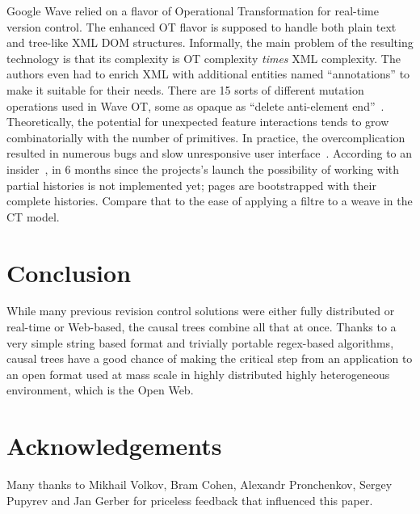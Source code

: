 \documentclass{acm_proc_article-sp}
\begin{document}
Google Wave relied on a flavor of Operational Transformation for
real-time version control. The enhanced OT flavor is supposed to
handle both plain text and tree-like XML DOM structures.
Informally, the main problem of the resulting technology is that
its complexity is OT complexity \emph{times} XML complexity. 
The authors even had to enrich XML with additional entities 
named ``annotations'' to make it suitable for their needs.
There are 15 sorts of different mutation operations used in Wave
OT, some as opaque as ``delete anti-element end''~\cite{waveot}.
Theoretically, the potential for unexpected feature interactions
tends to grow combinatorially with the number of primitives.
In practice, the overcomplication resulted in numerous bugs and
slow unresponsive user interface~\cite{own-experience}.
According to an insider~\cite{gerasimov}, in 6 months since the
projects's launch the possibility of working with partial
histories is not  implemented yet; pages are bootstrapped with
their complete histories. Compare that to the ease of applying
a filtre to a weave in the CT model.


\section {Conclusion}

While many previous revision control solutions were either
fully distributed or real-time or Web-based, the causal trees
combine all that at once. Thanks to a very simple string based
format and trivially portable regex-based algorithms, causal trees
have a good chance of making the critical step from an
application to an open format used at mass scale in highly
distributed highly heterogeneous environment, which is the Open Web.


\section{Acknowledgements}

Many thanks to Mikhail Volkov, Bram Cohen,
Alexandr Pronchenkov, Sergey Pupyrev and Jan Gerber for priceless
feedback that influenced this paper.




\end{document}

